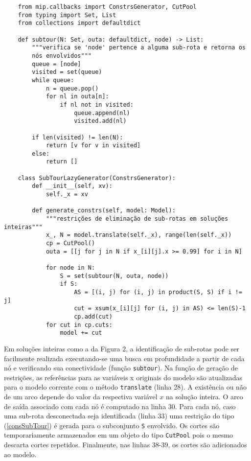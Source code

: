 \documentclass[a4paper,11pt,fleqn]{article}
\begin{document}
\begin{verbatim}
    from mip.callbacks import ConstrsGenerator, CutPool
    from typing import Set, List
    from collections import defaultdict

    def subtour(N: Set, outa: defaultdict, node) -> List:
        """verifica se 'node' pertence a alguma sub-rota e retorna os 
        nós envolvidos"""
        queue = [node]
        visited = set(queue)
        while queue:
            n = queue.pop()
            for nl in outa[n]:
                if nl not in visited:
                    queue.append(nl)
                    visited.add(nl)

        if len(visited) != len(N):
            return [v for v in visited]
        else:
            return []

    class SubTourLazyGenerator(ConstrsGenerator):
        def __init__(self, xv):
            self._x = xv

        def generate_constrs(self, model: Model):
            """restrições de eliminação de sub-rotas em soluções inteiras"""
            x_, N = model.translate(self._x), range(len(self._x))
            cp = CutPool()
            outa = [[j for j in N if x_[i][j].x >= 0.99] for i in N]

            for node in N:
                S = set(subtour(N, outa, node))
                if S:
                    AS = [(i, j) for (i, j) in product(S, S) if i != j]
                    cut = xsum(x_[i][j] for (i, j) in AS) <= len(S)-1
                    cp.add(cut)
            for cut in cp.cuts:
                model += cut
\end{verbatim}

Em soluções inteiras como a da Figura 2, a identificação de sub-rotas pode ser facilmente realizada executando-se uma busca em profundidade a partir de cada nó e verificando sua conectividade (função \texttt{subtour}). Na função de geração de restrições, as referências para as variáveis x originais do modelo são atualizadas para o modelo corrente com o método \texttt{translate} (linha 28). A existência ou não de um arco depende do valor da respectiva variável $x$ na solução inteira. O arco de saída associado com cada nó é computado na linha 30. Para cada nó, caso uma sub-rota desconectada seja identificada (linha 33) uma restrição do tipo (\ref{consSubTour}) é gerada para o subconjunto \texttt{S} envolvido. Os cortes são temporariamente armazenados em um objeto do tipo \texttt{CutPool} pois o mesmo descarta cortes repetidos. Finalmente, nas linhas 38-39, os cortes são adicionados ao modelo.
\end{document}
